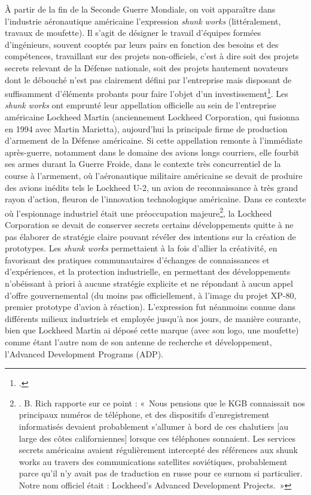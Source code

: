 \documentclass{FramateX}
\begin{document}
\begin{refsection}
À partir de la fin de la Seconde Guerre Mondiale, on voit apparaître
dans l'industrie aéronautique américaine l'expression
\textit{shunk}\textit{ }\textit{works} (littéralement, travaux de
moufette). Il s'agit de désigner le travail d'équipes
formées d'ingénieurs, souvent cooptés par leurs pairs
en fonction des besoins et des compétences, travaillant sur des projets
non-officiels, c'est à dire soit des projets secrets
relevant de la Défense nationale, soit des projets hautement novateurs
dont le débouché n'est pas clairement défini par
l'entreprise mais disposant de suffisamment
d'éléments probants pour faire
l'objet d'un
investissement\footnote{\cite{richskunk1996}.}. Les \textit{shunk}\textit{ }\textit{works} ont
emprunté leur appellation officielle au sein de
l'entreprise américaine Lockheed Martin (anciennement
Lockheed Corporation, qui fusionna en 1994 avec Martin Marietta),
aujourd'hui la principale firme de production
d'armement de la Défense américaine. Si cette
appellation remonte à l'immédiate après-guerre,
notamment dans le domaine des avions longs courriers, elle fourbit ses
armes durant la Guerre Froide, dans le contexte très concurrentiel de
la course à l'armement, où
l'aéronautique militaire américaine se devait de
produire des avions inédits tels le Lockheed U-2, un avion de
reconnaissance à très grand rayon d'action, fleuron de
l'innovation technologique américaine. Dans ce
contexte où l'espionnage industriel était une
préoccupation majeure\footnote{\cite[p.~6]{richskunk1996}. B. Rich rapporte sur
ce point : «~Nous pensions que le KGB connaissait nos principaux
numéros de téléphone, et des dispositifs
d'enregistrement informatisés devaient probablement
s'allumer à bord de ces chalutiers [au large des côtes
californiennes] lorsque ces téléphones sonnaient. Les services secrets
américains avaient régulièrement intercepté des références aux shunk
works au travers des communications satellites soviétiques,
probablement parce qu'il n'y avait
pas de traduction en russe pour ce surnom si particulier. Notre nom
officiel était : Lockheed's Advanced Development
Projects.~»}, la Lockheed Corporation se devait de conserver secrets
certains développements quitte à ne pas élaborer de stratégie claire
pouvant révéler des intentions sur la création de prototypes. Les
\textit{shunk works} permettaient à la fois
d'allier la créativité, en favorisant des pratiques
communautaires d'échanges de connaissances et
d'expériences, et la protection industrielle, en
permettant des développements n'obéissant à priori à
aucune stratégie explicite et ne répondant à aucun appel
d'offre gouvernemental (du moins pas officiellement, à
l'image du projet XP-80, premier prototype
d'avion à réaction). L'expression fut
néanmoins connue dans différents milieux industriels et employée
jusqu'à nos jours, de manière courante, bien que
Lockheed Martin ai déposé cette marque (avec son logo, une moufette)
comme étant l'autre nom de son antenne de recherche et
développement, l'Advanced Development Programs (ADP).


\end{refsection}
\end{document}
